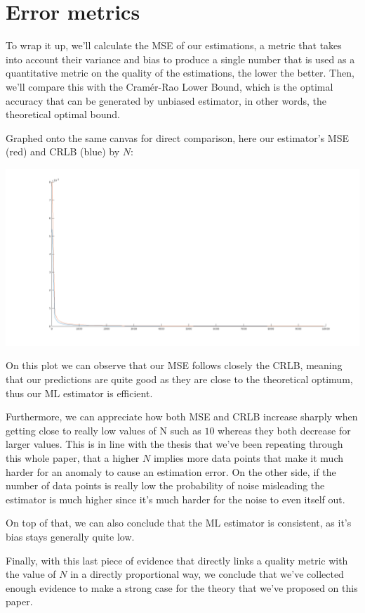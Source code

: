 \documentclass[conference,9pt]{IEEEtran}
\begin{document}
\section{Error metrics}
To wrap it up, we'll calculate the MSE of our estimations, a metric that takes into account their variance and bias to produce a single number that is used as a quantitative metric on the quality of the estimations, the lower the better. Then, we'll compare this with the Cramér-Rao Lower Bound, which is the optimal accuracy that can be generated by unbiased estimator, in other words, the theoretical optimal bound.

Graphed onto the same canvas for direct comparison, here our estimator's MSE (red) and CRLB (blue) by $N$:

\includegraphics[scale=0.18]{b7}

On this plot we can observe that our MSE follows closely the CRLB, meaning that our predictions are quite good as they are close to the theoretical optimum, thus our ML estimator is efficient.

Furthermore, we can appreciate how both MSE and CRLB increase sharply when getting close to really low values of N such as $10$ whereas they both decrease for larger values. This is in line with the thesis that we've been repeating through this whole paper, that a higher $N$ implies more data points that make it much harder for an anomaly to cause an estimation error. On the other side, if the number of data points is really low the probability of noise misleading the estimator is much higher since it's much harder for the noise to even itself out.

On top of that, we can also conclude that the ML estimator is consistent, as it's bias stays generally quite low.

Finally, with this last piece of evidence that directly links a quality metric with the value of $N$ in a directly proportional way, we conclude that we've collected enough evidence to make a strong case for the theory that we've proposed on this paper.
\end{document}
